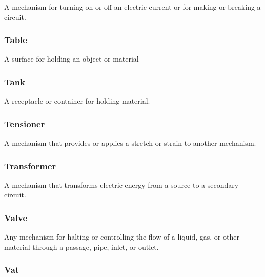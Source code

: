A mechanism for turning on or off an electric current or for making or breaking a circuit.

\FloatBarrier

\subsubsection{Table}
  \label{sec:Table}



A surface for holding an object or material

\FloatBarrier

\subsubsection{Tank}
  \label{sec:Tank}



A receptacle or container for holding material.

\FloatBarrier

\subsubsection{Tensioner}
  \label{sec:Tensioner}



A mechanism that provides or applies a stretch or strain to another mechanism.

\FloatBarrier

\subsubsection{Transformer}
  \label{sec:Transformer}



A mechanism that transforms electric energy from a source to a secondary circuit.

\FloatBarrier

\subsubsection{Valve}
  \label{sec:Valve}



Any mechanism for halting or controlling the flow of a liquid, gas, or other material through a passage, pipe, inlet, or outlet.

\FloatBarrier

\subsubsection{Vat}
  \label{sec:Vat}




